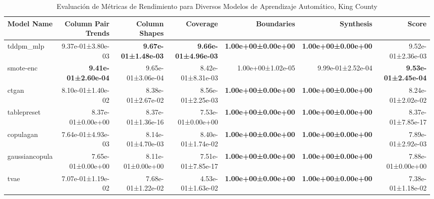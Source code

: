 \begin{table}[H]
\centering
\fontsize{7}{14}\selectfont
\caption{Evaluaci\'on de M\'etricas de Rendimiento para Diversos Modelos de Aprendizaje Autom\'atico, King County}
\label{table-score-king county-a}
\begin{tabular}{|l|r|r|r|r|r|r|}
\hline
\rowcolor[gray]{0.8}
Model Name & Column Pair Trends & Column Shapes & Coverage & Boundaries & Synthesis & \textbf{Score} \\
\hline tddpm\_mlp & 9.37e-01±3.80e-03 & \bfseries 9.67e-01±1.48e-03 & \bfseries 9.66e-01±4.96e-03 & \bfseries 1.00e+00±0.00e+00 & \bfseries 1.00e+00±0.00e+00 & 9.52e-01±2.36e-03 \\
\hline smote-enc & \bfseries 9.41e-01±2.60e-04 & 9.65e-01±3.06e-04 & 8.42e-01±8.31e-03 & 1.00e+00±1.02e-05 & 9.99e-01±2.52e-04 & \bfseries 9.53e-01±2.45e-04 \\
\hline ctgan & 8.10e-01±1.40e-02 & 8.38e-01±2.67e-02 & 8.56e-01±2.25e-03 & \bfseries 1.00e+00±0.00e+00 & \bfseries 1.00e+00±0.00e+00 & 8.24e-01±2.02e-02 \\
\hline tablepreset & 8.37e-01±0.00e+00 & 8.37e-01±1.36e-16 & 7.53e-01±0.00e+00 & \bfseries 1.00e+00±0.00e+00 & \bfseries 1.00e+00±0.00e+00 & 8.37e-01±7.85e-17 \\
\hline copulagan & 7.64e-01±4.93e-03 & 8.14e-01±4.70e-03 & 8.40e-01±1.74e-02 & \bfseries 1.00e+00±0.00e+00 & \bfseries 1.00e+00±0.00e+00 & 7.89e-01±2.92e-03 \\
\hline gaussiancopula & 7.65e-01±0.00e+00 & 8.11e-01±0.00e+00 & 7.51e-01±7.85e-17 & \bfseries 1.00e+00±0.00e+00 & \bfseries 1.00e+00±0.00e+00 & 7.88e-01±0.00e+00 \\
\hline tvae & 7.07e-01±1.19e-02 & 7.68e-01±1.22e-02 & 4.53e-01±1.63e-02 & \bfseries 1.00e+00±0.00e+00 & \bfseries 1.00e+00±0.00e+00 & 7.38e-01±1.18e-02 \\
\hline
\end{tabular}
\end{table}
